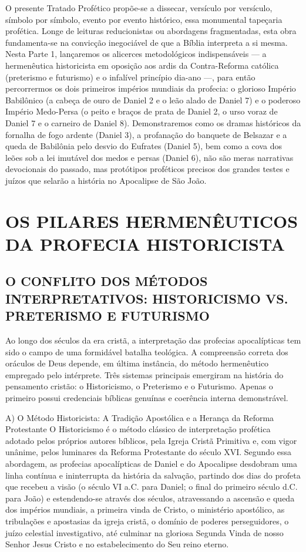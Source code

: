 O presente Tratado Profético propõe-se a dissecar, versículo por versículo, símbolo por símbolo, evento por evento histórico, essa monumental tapeçaria profética. Longe de leituras reducionistas ou abordagens fragmentadas, esta obra fundamenta-se na convicção inegociável de que a Bíblia interpreta a si mesma. Nesta Parte 1, lançaremos os alicerces metodológicos indispensáveis — a hermenêutica historicista em oposição aos ardis da Contra-Reforma católica (preterismo e futurismo) e o infalível princípio dia-ano —, para então percorrermos os dois primeiros impérios mundiais da profecia: o glorioso Império Babilônico (a cabeça de ouro de Daniel 2 e o leão alado de Daniel 7) e o poderoso Império Medo-Persa (o peito e braços de prata de Daniel 2, o urso voraz de Daniel 7 e o carneiro de Daniel 8). Demonstraremos como os dramas históricos da fornalha de fogo ardente (Daniel 3), a profanação do banquete de Belsazar e a queda de Babilônia pelo desvio do Eufrates (Daniel 5), bem como a cova dos leões sob a lei imutável dos medos e persas (Daniel 6), não são meras narrativas devocionais do passado, mas protótipos proféticos precisos dos grandes testes e juízos que selarão a história no Apocalipse de São João.



\section{OS PILARES HERMENÊUTICOS DA PROFECIA HISTORICISTA}



\subsection{O CONFLITO DOS MÉTODOS INTERPRETATIVOS: HISTORICISMO VS. PRETERISMO E FUTURISMO}


Ao longo dos séculos da era cristã, a interpretação das profecias apocalípticas tem sido o campo de uma formidável batalha teológica. A compreensão correta dos oráculos de Deus depende, em última instância, do método hermenêutico empregado pelo intérprete. Três sistemas principais emergiram na história do pensamento cristão: o Historicismo, o Preterismo e o Futurismo. Apenas o primeiro possui credenciais bíblicas genuínas e coerência interna demonstrável.

A) O Método Historicista: A Tradição Apostólica e a Herança da Reforma Protestante
O Historicismo é o método clássico de interpretação profética adotado pelos próprios autores bíblicos, pela Igreja Cristã Primitiva e, com vigor unânime, pelos luminares da Reforma Protestante do século XVI. Segundo essa abordagem, as profecias apocalípticas de Daniel e do Apocalipse desdobram uma linha contínua e ininterrupta da história da salvação, partindo dos dias do profeta que recebeu a visão (o século VI a.C. para Daniel; o final do primeiro século d.C. para João) e estendendo-se através dos séculos, atravessando a ascensão e queda dos impérios mundiais, a primeira vinda de Cristo, o ministério apostólico, as tribulações e apostasias da igreja cristã, o domínio de poderes perseguidores, o juízo celestial investigativo, até culminar na gloriosa Segunda Vinda de nosso Senhor Jesus Cristo e no estabelecimento do Seu reino eterno.

